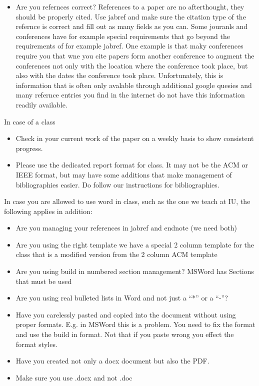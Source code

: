\begin{itemize}[label=$\Box$]
\item Are you refernces correct? References to a paper are no
  afterthought, they should be properly cited. Use jabref and make
  sure the citation type of the refernce is correct and fill out as
  many fields as you can. Some jouranls and conferences have for
  example special requirements that go beyond the requirements of for
  example jabref. One example is that maky conferences require you
  that wne you cite papers form another conference to augment the
  conferences not only with the location where the conference took
  place, but also with the dates the conference took
  place. Unfortunately, this is information that is often only
  avalable through additional google quesies and many refernce entries
  you find in the internet do not have this information readily
  available.

\end{itemize}

In case of a class

\begin{itemize}[label=$\Box$] 

\item Check in your current work of the paper on a weekly basis to
  show consistent progress.

\item Please use the dedicated report format for class. It may not be
  the ACM or IEEE format, but may have some additions that make
  management of bibliographies easier. Do follow our instructions for
  bibliographies.

\end{itemize}

In case you are allowed to use word in class, such as the one we teach
at IU, the following applies in addition:

\begin{itemize}[label=$\Box$] 

\item Are you managing your references in jabref and endnote (we need
  both)
\item Are you using the right template we have a special 2 column
  template for the class that is a modified version from the 2 column
  ACM template
\item Are you using build in numbered section management? MSWord has
  Sections that must be used
\item Are you using real bulleted lists in Word and not just a ``*''
  or a ``-''?
\item Have you carelessly pasted and copied into the document without
  using proper formats. E.g. in MSWord this is a problem. You need to
  fix the format and use the build in format. Not that if you paste
  wrong you effect the format styles.
\item Have you created not only a docx document but also the PDF.

\item Make sure you use .docx and not .doc

\end{itemize}

